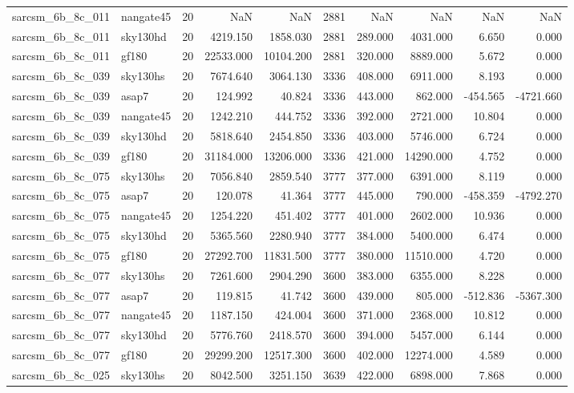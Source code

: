 \begin{tabular}{llrrrrrrrr}
sarcsm\_6b\_8c\_011 & nangate45 & 20 & NaN & NaN & 2881 & NaN & NaN & NaN & NaN \\
sarcsm\_6b\_8c\_011 & sky130hd & 20 & 4219.150 & 1858.030 & 2881 & 289.000 & 4031.000 & 6.650 & 0.000 \\
sarcsm\_6b\_8c\_011 & gf180 & 20 & 22533.000 & 10104.200 & 2881 & 320.000 & 8889.000 & 5.672 & 0.000 \\
sarcsm\_6b\_8c\_039 & sky130hs & 20 & 7674.640 & 3064.130 & 3336 & 408.000 & 6911.000 & 8.193 & 0.000 \\
sarcsm\_6b\_8c\_039 & asap7 & 20 & 124.992 & 40.824 & 3336 & 443.000 & 862.000 & -454.565 & -4721.660 \\
sarcsm\_6b\_8c\_039 & nangate45 & 20 & 1242.210 & 444.752 & 3336 & 392.000 & 2721.000 & 10.804 & 0.000 \\
sarcsm\_6b\_8c\_039 & sky130hd & 20 & 5818.640 & 2454.850 & 3336 & 403.000 & 5746.000 & 6.724 & 0.000 \\
sarcsm\_6b\_8c\_039 & gf180 & 20 & 31184.000 & 13206.000 & 3336 & 421.000 & 14290.000 & 4.752 & 0.000 \\
sarcsm\_6b\_8c\_075 & sky130hs & 20 & 7056.840 & 2859.540 & 3777 & 377.000 & 6391.000 & 8.119 & 0.000 \\
sarcsm\_6b\_8c\_075 & asap7 & 20 & 120.078 & 41.364 & 3777 & 445.000 & 790.000 & -458.359 & -4792.270 \\
sarcsm\_6b\_8c\_075 & nangate45 & 20 & 1254.220 & 451.402 & 3777 & 401.000 & 2602.000 & 10.936 & 0.000 \\
sarcsm\_6b\_8c\_075 & sky130hd & 20 & 5365.560 & 2280.940 & 3777 & 384.000 & 5400.000 & 6.474 & 0.000 \\
sarcsm\_6b\_8c\_075 & gf180 & 20 & 27292.700 & 11831.500 & 3777 & 380.000 & 11510.000 & 4.720 & 0.000 \\
sarcsm\_6b\_8c\_077 & sky130hs & 20 & 7261.600 & 2904.290 & 3600 & 383.000 & 6355.000 & 8.228 & 0.000 \\
sarcsm\_6b\_8c\_077 & asap7 & 20 & 119.815 & 41.742 & 3600 & 439.000 & 805.000 & -512.836 & -5367.300 \\
sarcsm\_6b\_8c\_077 & nangate45 & 20 & 1187.150 & 424.004 & 3600 & 371.000 & 2368.000 & 10.812 & 0.000 \\
sarcsm\_6b\_8c\_077 & sky130hd & 20 & 5776.760 & 2418.570 & 3600 & 394.000 & 5457.000 & 6.144 & 0.000 \\
sarcsm\_6b\_8c\_077 & gf180 & 20 & 29299.200 & 12517.300 & 3600 & 402.000 & 12274.000 & 4.589 & 0.000 \\
sarcsm\_6b\_8c\_025 & sky130hs & 20 & 8042.500 & 3251.150 & 3639 & 422.000 & 6898.000 & 7.868 & 0.000 \\

\end{tabular}
